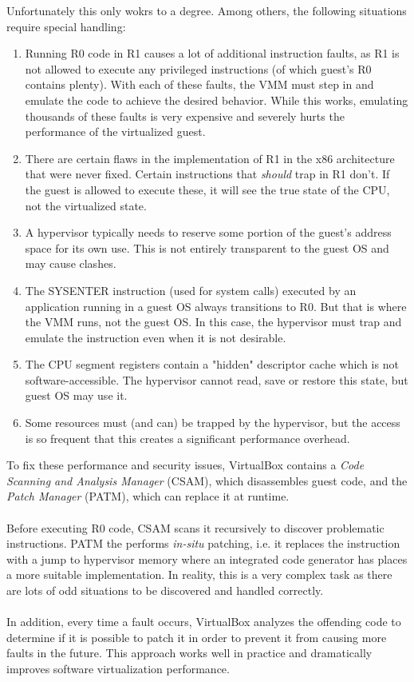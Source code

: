 \documentclass[a4paper, 12pt, titlepage]{report}
\begin{document}
Unfortunately this only wokrs to a degree. Among others, the following situations require special handling:
\begin{enumerate}
\item Running R0 code in R1 causes a lot of additional instruction faults, as R1 is not allowed to execute any privileged instructions (of which guest's R0 contains plenty). With each of these faults, the VMM must step in and emulate the code to achieve the desired behavior. While this works, emulating thousands of these faults is very expensive and severely hurts the performance of the virtualized guest.
\item There are certain flaws in the implementation of R1 in the x86 architecture that were never fixed. Certain instructions that \textit{should} trap in R1 don't. If the guest is allowed to execute these, it will see the true state of the CPU, not the virtualized state.
\item A hypervisor typically needs to reserve some portion of the guest's address space for its own use. This is not entirely transparent to the guest OS and may cause clashes.
\item The SYSENTER instruction (used for system calls) executed by an application running in a guest OS always transitions to R0. But that is where the VMM runs, not the guest OS. In this case, the hypervisor must trap and emulate the instruction even when it is not desirable.
\item The CPU segment registers contain a "hidden" descriptor cache which is not software-accessible. The hypervisor cannot read, save or restore this state, but guest OS may use it.
\item Some resources must (and can) be trapped by the hypervisor, but the access is so frequent that this creates a significant performance overhead.
\end{enumerate}
To fix these performance and security issues, VirtualBox contains a \textit{Code Scanning and Analysis Manager} (CSAM), which disassembles guest code, and the \textit{Patch Manager} (PATM), which can replace it at runtime.
\\
\\
Before executing R0 code, CSAM scans it recursively to discover problematic instructions. PATM the performs \textit{in-situ} patching, i.e. it replaces the instruction with a jump to hypervisor memory where an integrated code generator has places a more suitable implementation. In reality, this is a very complex task as there are lots of odd situations to be discovered and handled correctly.
\\
\\
In addition, every time a fault occurs, VirtualBox analyzes the offending code to determine if it is possible to patch it in order to prevent it from causing more faults in the future. This approach works well in practice and dramatically improves software virtualization performance.
\end{document}
